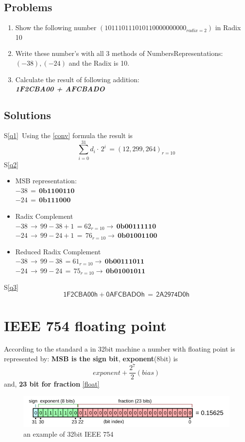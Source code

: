 \subsection{Problems}
\begin{enumerate}
	\item  Show the following number \label{q1} \(\left(1011 1011 1010 1100 0000 0000_{radix=2}\right)\) in Radix 10
	\item Write these number's with all 3 methods of Numbers\linebreak Representations: \((-38),\left(-24\right)\) and the Radix is 10.\label{q2}
	\item Calculate the result of following addition:\\
	\textbf{\textit{1F2CBA00 + AFCBADO}}\label{q3}
\end{enumerate}
\subsection{Solutions}
S\ref{q1}\, Using the \ref{conv} formula the result is\[
	\sum_{i=0}^{31}d_{i}\cdot\,2^{i}\,= (12,299,264)_{r=10}
\]
S\ref{q2} \begin{itemize}
	\item MSB representation: \\
	\(-38\,=\,\mathbf{0b1100110}\)\\
	\(-24\,=\,\mathbf{0b111000}\)
	\item Radix Complement \\
	\(-38\,\rightarrow\,99-38+1\,=62_{r=10}\rightarrow\,\mathbf{0b0011 1110}\)\\
	\(-24\,\rightarrow\,99-24+1\,=\,76_{r=10}\rightarrow\,\mathbf{0b0100 1100}\)\\
	\item Reduced Radix Complement\\
	\(-38\,\rightarrow\,99-38\,=61_{r=10}\rightarrow\,\mathbf{0b0011 1011}\)\\
	\(-24\,\rightarrow\,99-24\,=\,75_{r=10}\rightarrow\,\mathbf{0b0100 1011}\)\\
\end{itemize}
S\ref{q3}
\[
\mathsf{1F2CBA00h + 0AFCBADOh\,=\,  2A2974D0h}
\]

\section{IEEE 754 floating point}
According to the standard a in 32bit machine a number with floating point is represented by:\textbf{ MSB is the sign bit}, \textbf{exponent}(8bit) is\[exponent +  \frac{2^{7}}{2}(bias)\] and, \textbf{23 bit for fraction} \autoref{float}
\begin{figure}[b!]
	\includegraphics{float.png}
	\caption{an example of 32bit IEEE 754}
	\label{float}
\end{figure}


